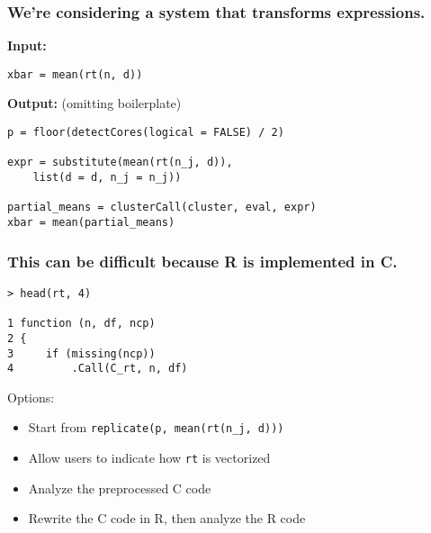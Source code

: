 \documentclass{beamer}
\begin{document}
\begin{frame}[fragile]

    \frametitle{We're considering a system that transforms expressions.}


\hfill

    \textbf{Input:}

\begin{verbatim}
xbar = mean(rt(n, d))
\end{verbatim}

\hfill

    \textbf{Output:} (omitting boilerplate)

\begin{verbatim}
p = floor(detectCores(logical = FALSE) / 2)

expr = substitute(mean(rt(n_j, d)),
    list(d = d, n_j = n_j))

partial_means = clusterCall(cluster, eval, expr)
xbar = mean(partial_means)
\end{verbatim}

\hfill

\end{frame}
\begin{frame}[fragile]

    \frametitle{This can be difficult because R is implemented in C.}


\begin{verbatim}
> head(rt, 4)

1 function (n, df, ncp)
2 {
3     if (missing(ncp))
4         .Call(C_rt, n, df)
\end{verbatim}

\pause

    Options:

    \begin{itemize}
        \item Start from \texttt{replicate(p, mean(rt(n\_j, d)))}
        \item Allow users to indicate how \texttt{rt} is vectorized
        \item Analyze the preprocessed C code
        \item Rewrite the C code in R, then analyze the R code
    \end{itemize}

\end{frame}
\end{document}
